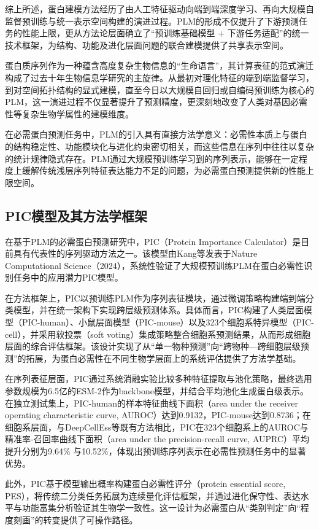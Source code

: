 综上所述，蛋白建模方法经历了由人工特征驱动向端到端深度学习、再向大规模自监督预训练与统一表示空间构建的演进过程。PLM的形成不仅提升了下游预测任务的性能上限，更从方法论层面确立了“预训练基础模型 + 下游任务适配”的统一技术框架，为结构、功能及进化层面问题的联合建模提供了共享表示空间。

蛋白质序列作为一种蕴含高度复杂生物信息的“生命语言”，其计算表征的范式演迁构成了过去十年生物信息学研究的主旋律。从最初对理化特征的端到端监督学习，到对空间拓扑结构的显式建模，直至今日以大规模自回归或自编码预训练为核心的PLM，这一演进过程不仅显著提升了预测精度，更深刻地改变了人类对基因必需性等复杂生物学属性的建模维度。

在必需蛋白预测任务中，PLM的引入具有直接方法学意义：必需性本质上与蛋白的结构稳定性、功能模块化与进化约束密切相关，而这些信息在序列中往往以复杂的统计规律隐式存在。PLM通过大规模预训练学习到的序列表示，能够在一定程度上缓解传统浅层序列特征表达能力不足的问题，为必需蛋白预测提供新的性能上限空间。

\subsection{PIC模型及其方法学框架}

在基于PLM的必需蛋白预测研究中，PIC（Protein Importance Calculator）是目前具有代表性的序列驱动方法之一。该模型由Kang等发表于Nature Computational Science（2024），系统性验证了大规模预训练PLM在蛋白必需性识别任务中的应用潜力PIC模型\cite{kang2024comprehensive}。

在方法框架上，PIC以预训练PLM作为序列表征模块，通过微调策略构建端到端分类模型，并在统一架构下实现跨层级预测体系。具体而言，PIC构建了人类层面模型（PIC-human）、小鼠层面模型（PIC-mouse）以及323个细胞系特异模型（PIC-cell），并采用软投票（soft voting）集成策略整合细胞系预测结果，从而形成细胞层面的综合评估框架。该设计实现了从“单一物种预测”向“跨物种—跨细胞层级预测”的拓展，为蛋白必需性在不同生物学层面上的系统评估提供了方法学基础。

在序列表征层面，PIC通过系统消融实验比较多种特征提取与池化策略，最终选用参数规模为6.5亿的ESM-2作为backbone模型，并结合平均池化生成蛋白级表示。在独立测试集上，PIC-human的样本特征曲线下面积（area under the receiver operating characteristic curve, AUROC）达到0.9132，PIC-mouse达到0.8736；在细胞系层面，与DeepCellEss等既有方法相比，PIC在323个细胞系上的AUROC与精准率-召回率曲线下面积（area under the precision-recall curve, AUPRC）平均提升分别为9.64\% 与10.52\%，体现出预训练序列表示在必需性预测任务中的显著优势。

此外，PIC基于模型输出概率构建蛋白必需性评分（protein essential score, PES），将传统二分类任务拓展为连续量化评估框架，并通过进化保守性、表达水平与功能富集分析验证其生物学一致性。这一设计为必需蛋白从“类别判定”向“程度刻画”的转变提供了可操作路径。

